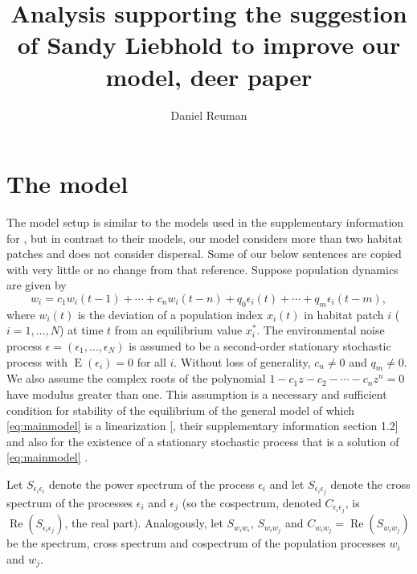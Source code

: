 \documentclass[letterpaper,11pt]{article}
\newcommand{\E}{{\operatorname{E}}}
\newcommand{\Rp}{{\operatorname{Re}}}
\begin{document}
\title{Analysis supporting the suggestion of Sandy Liebhold to improve our model, deer paper}
\author{Daniel Reuman}
\maketitle

\section{The model}\label{sec:model}

The model setup is similar to the models used in the supplementary information for 
\cite{Desharnais2018}, but in
contrast to their models, our model
considers more than two habitat patches and does not consider dispersal.
Some of our below sentences are copied with very little or no change from that reference.
Suppose population dynamics are given by
\begin{equation}
w_{i} = c_1 w_i(t-1)+ \cdots + c_n w_i(t-n)+q_0 \epsilon_{i}(t)+\cdots+q_{m}\epsilon_{i}(t-m),\label{eq:mainmodel}
\end{equation}
where $w_{i}(t)$ is the deviation of a population index $x_{i}(t)$ in
habitat patch $i$ ($i=1,\ldots,N$) at time $t$ from an equilibrium value $x_{i}^{*}$. 
The environmental noise process $\epsilon=(\epsilon_{1},\ldots,\epsilon_{N})$
is assumed to be a second-order stationary stochastic process with $\E(\epsilon_{i})=0$
for all $i$. Without loss of generality, $c_n \neq 0$ and $q_m \neq 0$. We also assume
the complex roots of the polynomial $1-c_1 z - c_2 - \cdots - c_n z^n=0$
have modulus greater than one. This assumption is a necessary and sufficient condition 
for stability of the equilibrium of the general model of which \ref{eq:mainmodel}
is a linearization [\citealp{Desharnais2018}, their supplementary information section 1.2] and also for the existence of a stationary
stochastic process that is a solution of \ref{eq:mainmodel} \citep{Desharnais2018,Brillinger2011}. 

Let $S_{\epsilon_{i}\epsilon_{i}}$
denote the power spectrum of the process $\epsilon_{i}$ and let $S_{\epsilon_{i}\epsilon_{j}}$
denote the cross spectrum of the processes $\epsilon_{i}$ and $\epsilon_{j}$
(so the cospectrum, denoted $C_{\epsilon_{i}\epsilon_{j}}$, is $\Rp(S_{\epsilon_{i}\epsilon_{j}})$, the real part). Analogously, let $S_{w_i w_i}$,
$S_{w_i w_j}$ and $C_{w_i w_j}=\Rp(S_{w_i w_j})$ be the spectrum, cross spectrum
and cospectrum of the population processes $w_i$ and $w_j$.
\end{document}
